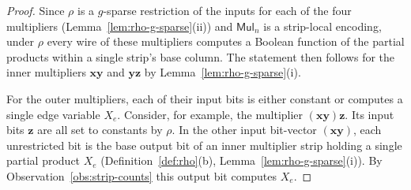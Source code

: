 \documentclass[11pt]{article}
\theoremstyle{definition}
\theoremstyle{remark}
\newcommand{\Mul}{\mathsf{Mul}}
\newcommand{\vv}[1]{\mathbf{#1}}
\begin{document}
\begin{proof}
Since $\rho$ is a $g$-sparse restriction of the inputs for each of the four
multipliers (Lemma~\ref{lem:rho-g-sparse}(ii)) and $\Mul_n$ is a strip-local encoding, under $\rho$ every wire of these multipliers computes a Boolean function of the partial products within a single
strip's base column. The statement then follows for the inner multipliers $\vv{x}\vv{y}$ and $\vv{y}\vv{z}$ by Lemma~\ref{lem:rho-g-sparse}(i).

For the outer multipliers, each of their input bits is either constant or computes a single edge variable $X_e$. Consider, for example, the multiplier $(\vv{x}\vv{y})\vv{z}$. Its input bits $\vv{z}$ are all set to constants by $\rho$. In the other input bit-vector $(\vv{x}\vv{y})$, each unrestricted bit is the base output bit of an inner multiplier strip holding a single partial product
$X_e$ (Definition~\ref{def:rho}(b), Lemma~\ref{lem:rho-g-sparse}(i)). By Observation~\ref{obs:strip-counts} this output bit computes $X_e$.


\end{proof}
\end{document}
